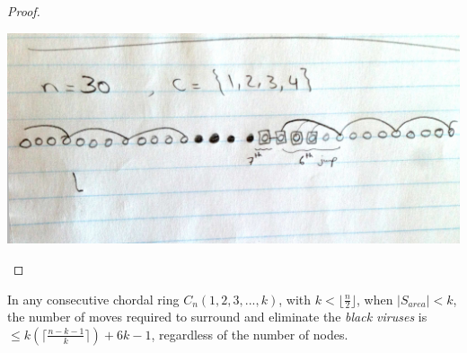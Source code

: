 \begin{proof}
\begin{itemize}
\end{itemize}
\begin {center}
\includegraphics [scale=0.50] {consecutive.jpg}
\end {center}
\end{proof}




\begin{theorem}
In any consecutive chordal ring $C_n(1,2,3,...,k)$, with  $ k  < \lfloor\frac{n}{2}\rfloor$, when $|S_{area}|< k$, the number of moves required to surround and eliminate the {\it black viruses} is $\leq k(\lceil \frac {n-k-1}{k} \rceil) +6k-1$, regardless of the number of nodes.
\end{theorem}


